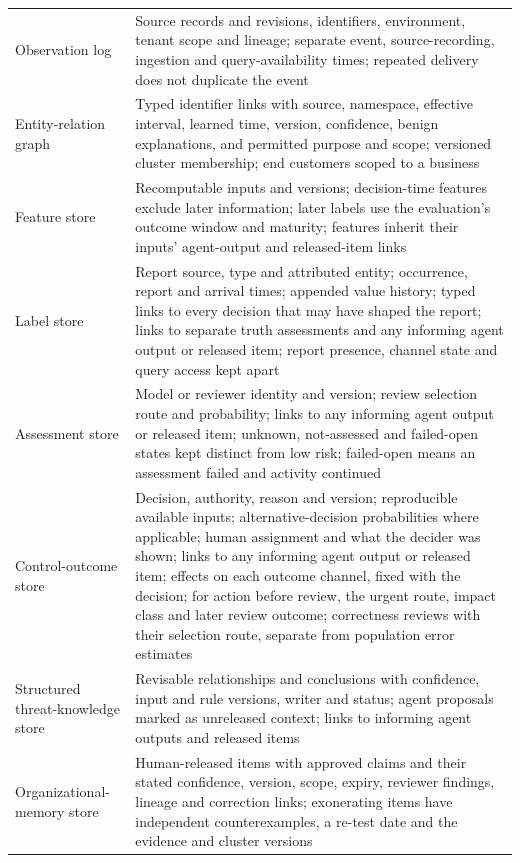 \documentclass[
  11pt,
]{article}
\begin{document}
\begin{table}[tp]
{\begin{tabular}{@{}
  >{\raggedright\arraybackslash}p{}
  >{\raggedright\arraybackslash}p{}@{}}
Observation log & Source records and revisions, identifiers,
environment, tenant scope and lineage; separate event, source-recording,
ingestion and query-availability times; repeated delivery does not
duplicate the event \\
Entity-relation graph & Typed identifier links with source, namespace,
effective interval, learned time, version, confidence, benign
explanations, and permitted purpose and scope; versioned cluster
membership; end customers scoped to a business \\
Feature store & Recomputable inputs and versions; decision-time features
exclude later information; later labels use the evaluation's outcome
window and maturity; features inherit their inputs' agent-output and
released-item links \\
Label store & Report source, type and attributed entity; occurrence,
report and arrival times; appended value history; typed links to every
decision that may have shaped the report; links to separate truth
assessments and any informing agent output or released item; report
presence, channel state and query access kept apart \\
Assessment store & Model or reviewer identity and version; review
selection route and probability; links to any informing agent output or
released item; unknown, not-assessed and failed-open states kept
distinct from low risk; failed-open means an assessment failed and
activity continued \\
Control-outcome store & Decision, authority, reason and version;
reproducible available inputs; alternative-decision probabilities where
applicable; human assignment and what the decider was shown; links to
any informing agent output or released item; effects on each outcome
channel, fixed with the decision; for action before review, the urgent
route, impact class and later review outcome; correctness reviews with
their selection route, separate from population error estimates \\
Structured threat-knowledge store & Revisable relationships and
conclusions with confidence, input and rule versions, writer and status;
agent proposals marked as unreleased context; links to informing agent
outputs and released items \\
Organizational-memory store & Human-released items with approved claims
and their stated confidence, version, scope, expiry, reviewer findings,
lineage and correction links; exonerating items have independent
counterexamples, a re-test date and the evidence and cluster versions

\end{tabular}}
\end{table}
\end{document}
